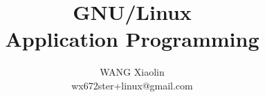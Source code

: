 \usepackage{wx672tut}



\newcommand{\textbooks}{\nocite{cs241, matthew2008beginning, cooper10bash, raymond2003art,
    stevens2013advanced, love:2007:lsp:1205435, kerrisk:2010:lpi:1869911,
    bryant2010computersystems}}%



\title{GNU/Linux\\Application Programming}
\author{WANG Xiaolin\\%
  {\footnotesize\ttfamily wx672ster+linux@gmail.com}}



